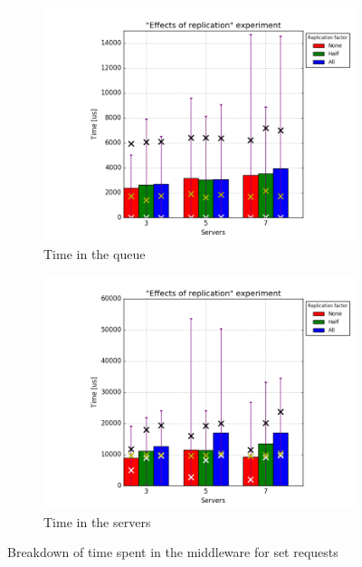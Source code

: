 \documentclass[11pt]{article}
\begin{document}
\begin{figure}
\centering
\begin{subfigure}{.5\textwidth}
	\centering
	\includegraphics[width=\linewidth]{plots/replication-set-queue}
	\caption{Time in the queue}
	\label{fig:replication-set-queue}
\end{subfigure}%
\begin{subfigure}{.5\textwidth}
	\centering
	\includegraphics[width=\linewidth]{plots/replication-set-servers}
	\caption{Time in the servers}
	\label{fig:replication-set-servers}
\end{subfigure}
\caption{Breakdown of time spent in the middleware for set requests}
\label{fig:replication-set-breakdown}
\end{figure}
\end{document}
